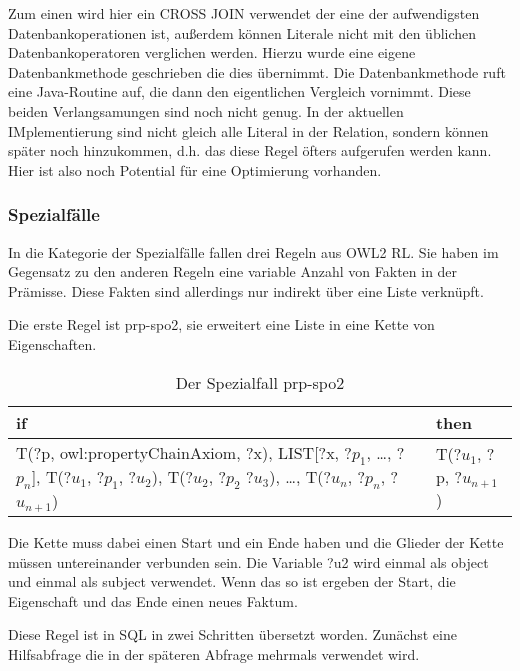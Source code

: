 Zum einen wird hier ein CROSS JOIN verwendet der eine der aufwendigsten Datenbankoperationen ist, außerdem können Literale nicht mit den üblichen Datenbankoperatoren verglichen werden. Hierzu wurde eine eigene Datenbankmethode geschrieben die dies übernimmt. Die Datenbankmethode ruft eine Java-Routine auf, die dann den eigentlichen Vergleich vornimmt. Diese beiden Verlangsamungen sind noch nicht genug. In der aktuellen IMplementierung sind nicht gleich alle Literal in der Relation, sondern können später noch hinzukommen, d.h. das diese Regel öfters aufgerufen werden kann. Hier ist also noch Potential für eine Optimierung vorhanden.


\subsubsection{Spezialfälle} 
In die Kategorie der Spezialfälle fallen drei Regeln aus OWL2 RL. Sie haben im Gegensatz zu den anderen Regeln eine variable Anzahl von Fakten in der Prämisse. Diese Fakten sind allerdings nur indirekt über eine Liste verknüpft.

Die erste Regel ist prp-spo2, sie erweitert eine Liste in eine Kette von Eigenschaften.
\begin{table}[htb]
\begin{center}
	\begin{tabular}{m{7cm}|m{3cm}}
	if & then \\ \hline
	T(?p, owl:propertyChainAxiom, ?x),\newline
	LIST[?x, ?$p_1$, \ldots, ?$p_n$],\newline
	T(?$u_1$, ?$p_1$, ?$u_2$),\newline
	T(?$u_2$, ?$p_2$ ?$u_3$),\newline
	\ldots,\newline
	T(?$u_n$, ?$p_n$, ?$u_{n+1}$) & T(?$u_1$, ?p, ?$u_{n+1}$)
	\end{tabular}
\end{center}
	\caption{Der Spezialfall prp-spo2}
	\label{rule-prp-spo2}
\end{table}

Die Kette muss dabei einen Start und ein Ende haben und die Glieder der Kette müssen untereinander verbunden sein. Die Variable ?u2 wird einmal als object und einmal als subject verwendet. Wenn das so ist ergeben der Start, die Eigenschaft und das Ende einen neues Faktum.

Diese Regel ist in SQL in zwei Schritten übersetzt worden. Zunächst eine Hilfsabfrage die in der späteren Abfrage mehrmals verwendet wird.

